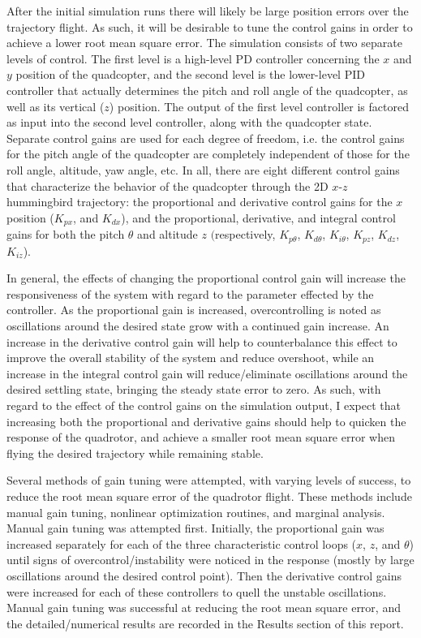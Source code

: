 \documentclass[onecolumn,10pt]{IEEEtran}
\begin{document}
After the initial simulation runs there will likely be large position errors over the trajectory flight. As such, it will be desirable to tune the control gains in order to achieve a lower root mean square error. The simulation consists of two separate levels of control. The first level is a high-level PD controller concerning the $x$ and $y$ position of the quadcopter, and the second level is the lower-level PID controller that actually determines the pitch and roll angle of the quadcopter, as well as its vertical ($z$) position. The output of the first level controller is factored as input into the second level controller, along with the quadcopter state. Separate control gains are used for each degree of freedom, i.e. the control gains for the pitch angle of the quadcopter are completely independent of those for the roll angle, altitude, yaw angle, etc. In all, there are eight different control gains that characterize the behavior of the quadcopter through the 2D $x$-$z$ hummingbird trajectory: the proportional and derivative control gains for the $x$ position ($K_{px}$, and $K_{dx}$), and the proportional, derivative, and integral control gains for both the pitch $\theta$ and altitude $z$ $($respectively, $K_{p\theta}$, $K_{d\theta}$, $K_{i\theta}$, $K_{pz}$, $K_{dz}$, $K_{iz}$). 

In general, the effects of changing the proportional control gain will increase the responsiveness of the system with regard to the parameter effected by the controller. As the proportional gain is increased, overcontrolling is noted as oscillations around the desired state grow with a continued gain increase. An increase in the derivative control gain will help to counterbalance this effect to improve the overall stability of the system and reduce overshoot, while an increase in the integral control gain will reduce/eliminate oscillations around the desired settling state, bringing the steady state error to zero. As such, with regard to the effect of the control gains on the simulation output, I expect that increasing both the proportional and derivative gains should help to quicken the response of the quadrotor, and achieve a smaller root mean square error when flying the desired trajectory while remaining stable.

Several methods of gain tuning were attempted, with varying levels of success, to reduce the root mean square error of the quadrotor flight. These methods include manual gain tuning, nonlinear optimization routines, and marginal analysis. Manual gain tuning was attempted first. Initially, the proportional gain was increased separately for each of the three characteristic control loops ($x$, $z$, and $\theta$) until signs of overcontrol/instability were noticed in the response (mostly by large oscillations around the desired control point). Then the derivative control gains were increased for each of these controllers to quell the unstable oscillations. Manual gain tuning was successful at reducing the root mean square error, and the detailed/numerical results are recorded in the Results section of this report.
\end{document}
